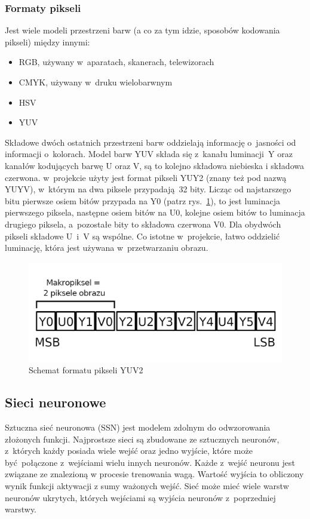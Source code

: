 \documentclass[12pt, oneside, a4paper]{article}
\begin{document}
\subsubsection{Formaty pikseli}
Jest wiele modeli przestrzeni barw (a co za tym idzie, sposobów kodowania
pikseli) między innymi:
\begin{itemize}
  \item RGB, używany w~aparatach, skanerach, telewizorach
  \item CMYK, używany w~druku wielobarwnym
  \item HSV
  \item YUV
\end{itemize}
Składowe dwóch ostatnich przestrzeni barw oddzielają informację o~jasności
od informacji o~kolorach. Model barw YUV składa się z~kanału luminacji~Y
oraz kanałów kodujących barwę U oraz V, są to kolejno składowa niebieska
i składowa czerwona. w~projekcie użyty jest format pikseli YUY2 (znany też
pod nazwą YUYV), w~którym na dwa piksele przypadają 32 bity.
Licząc od najstarszego bitu pierwsze osiem bitów przypada na Y0 (patrz
rys.~\ref{fig:yuv2}), to jest
luminacja pierwszego piksela, następne osiem bitów na U0, kolejne osiem bitów
to luminacja drugiego piksela, a~pozostałe bity to składowa czerwona V0.
Dla obydwóch pikseli składowe U~i~V są wspólne. Co istotne w~projekcie,
łatwo oddzielić luminację, która jest używana w~przetwarzaniu obrazu.
\begin{figure}[h]
  \centering
  \includegraphics[scale=1.4]{figures/yuv2-scheme.png} 
  \caption{Schemat formatu pikseli YUV2}\label{fig:yuv2}
\end{figure}

\subsection{Sieci neuronowe}
Sztuczna sieć neuronowa (SSN) jest modelem zdolnym do odwzorowania złożonych
funkcji. Najprostsze sieci są zbudowane ze sztucznych neuronów, z~których każdy
posiada wiele wejść oraz jedno wyjście, które może być połączone z~wejściami
wielu innych neuronów. Każde z~wejść neuronu jest związane ze znalezioną
w procesie trenowania wagą. Wartość wyjścia to obliczony wynik funkcji aktywacji
z sumy ważonych wejść. Sieć może mieć wiele warstw neuronów ukrytych, których
wejściami są wyjścia neuronów z~poprzedniej warstwy. 
\end{document}
